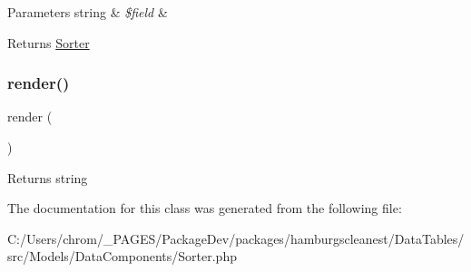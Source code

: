\begin{DoxyParams}[1]{Parameters}
string & {\em \$field} & \\
\hline
\end{DoxyParams}
\begin{DoxyReturn}{Returns}
\hyperlink{classhamburgscleanest_1_1_data_tables_1_1_models_1_1_data_components_1_1_sorter}{Sorter} 
\end{DoxyReturn}
\mbox{\label{classhamburgscleanest_1_1_data_tables_1_1_models_1_1_data_components_1_1_sorter_afde88292c44dc59faf017738dae6dffb}} 
\subsubsection{\texorpdfstring{render()}{render()}}
{\footnotesize\ttfamily render (\begin{DoxyParamCaption}{ }\end{DoxyParamCaption})}

\begin{DoxyReturn}{Returns}
string 
\end{DoxyReturn}


The documentation for this class was generated from the following file\+:\begin{DoxyCompactItemize}
\item 
C\+:/\+Users/chrom/\+\_\+\+P\+A\+G\+E\+S/\+Package\+Dev/packages/hamburgscleanest/\+Data\+Tables/src/\+Models/\+Data\+Components/Sorter.\+php\end{DoxyCompactItemize}
